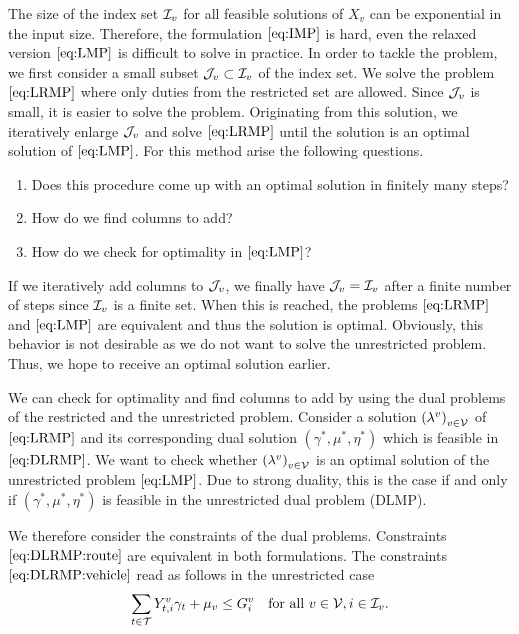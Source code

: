 The size of the index set $\mathcal{I}_v$ for all feasible solutions of $X_v$ can be exponential in the input size. Therefore, the formulation $\eqref{eq:IMP}$ is hard, even the relaxed version $\eqref{eq:LMP}$ is difficult to solve in practice. In order to tackle the problem, we first consider a small subset $\mathcal{J}_v\subset\mathcal{I}_v$ of the index set. We solve the problem $\eqref{eq:LRMP}$ where only duties from the restricted set are allowed. Since $\mathcal{J}_v$ is small, it is easier to solve the problem. Originating from this solution, we iteratively enlarge $\mathcal{J}_v$ and solve $\eqref{eq:LRMP}$ until the solution is an optimal solution of $\eqref{eq:LMP}$. For this method arise the following questions.
\begin{enumerate}
	\item{Does this procedure come up with an optimal solution in finitely many steps?}
	\item{How do we find columns to add?}
	\item{How do we check for optimality in $\eqref{eq:LMP}$?}
\end{enumerate}

If we iteratively add columns to $\mathcal{J}_v$, we finally have $\mathcal{J}_v=\mathcal{I}_v$ after a finite number of steps since $\mathcal{I}_v$ is a finite set. When this is reached, the problems $\eqref{eq:LRMP}$ and $\eqref{eq:LMP}$ are equivalent and thus the solution is optimal. Obviously, this behavior is not desirable as we do not want to solve the unrestricted problem. Thus, we hope to receive an optimal solution earlier.

We can check for optimality and find columns to add by using the dual problems of the restricted and the unrestricted problem. Consider a solution $\left(\lambda^v\right)_{v\in\mathcal{V}}$ of $\eqref{eq:LRMP}$ and its corresponding dual solution $\left(\gamma^*,\mu^*,\eta^*\right)$ which is feasible in $\eqref{eq:DLRMP}$. We want to check whether $\left(\lambda^v\right)_{v\in\mathcal{V}}$ is an optimal solution of the unrestricted problem $\eqref{eq:LMP}$. Due to strong duality, this is the case if and only if $\left(\gamma^*,\mu^*,\eta^*\right)$ is feasible in the unrestricted dual problem (DLMP).

We therefore consider the constraints of the dual problems. Constraints $\eqref{eq:DLRMP:route}$ are equivalent in both formulations. The constraints $\eqref{eq:DLRMP:vehicle}$ read as follows in the unrestricted case
\begin{align}
	\sum_{t\in\mathcal{T}} Y^v_{t,i}\gamma_t + \mu_v \leq G^v_i && \text{for all } v\in\mathcal{V},i\in\mathcal{I}_v. \label{eq:DLMP:vehicle}
\end{align}

